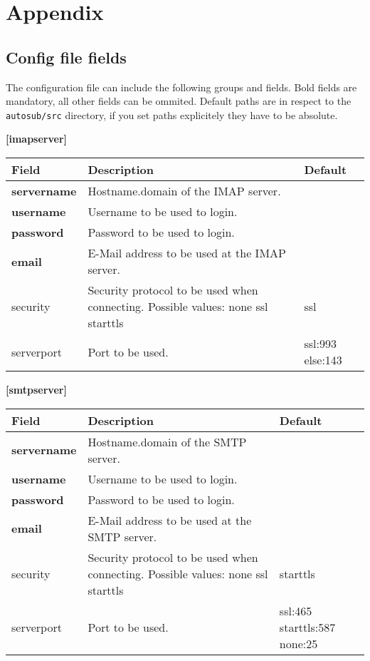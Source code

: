\section{Appendix} \label{appendix}

\subsection{Config file fields} \label{app:config}
The configuration file can include the following groups and fields. Bold fields
are mandatory, all other fields can be ommited. Default paths are in respect to
the {\tt autosub/src} directory, if you set paths explicitely they have to be absolute.

{\bf [imapserver]}\\
\begin{tabular}{|p{2.5cm}|p{8cm}|p{2.5cm}|}
\hline
{\bf Field} & {\bf Description} & {\bf Default}\\
\hline
\hline
\textbf{servername} & Hostname.domain of the IMAP server. & ~\\
\hline
\textbf{username} & Username to be used to login. & ~ \\
\hline
\textbf{password} & Password to be used to login. & ~ \\
\hline
\textbf{email} & E-Mail address to be used at the IMAP server. & ~ \\
\hline
security & Security protocol to be used when connecting.
    Possible values: none ssl starttls & ssl \\
\hline
serverport & Port to be used. & ssl:993 else:143\\
\hline
\end{tabular}


{\bf [smtpserver]}\\
\begin{tabular}{|p{2.5cm}|p{8cm}|p{2.5cm}|}
\hline
{\bf Field} & {\bf Description} & {\bf Default}\\
\hline
\hline
\textbf{servername} & Hostname.domain of the SMTP server. & ~ \\
\hline
\textbf{username}& Username to be used to login. & ~ \\
\hline
\textbf{password} & Password to be used to login. & ~ \\
\hline
\textbf{email} & E-Mail address to be used at the SMTP server. & ~ \\
\hline
security & Security protocol to be used when connecting.
    Possible values: none ssl starttls & starttls\\
\hline
serverport & Port to be used. & ssl:465 starttls:587 none:25 \\
\hline
\end{tabular}

